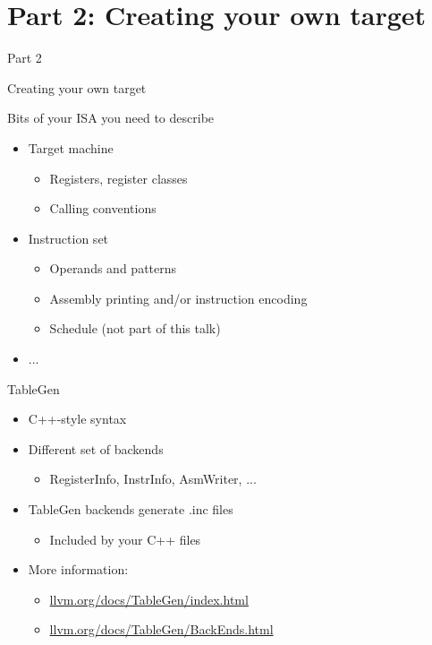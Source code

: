 \section{Part 2: Creating your own target}

\begin{frame}{Part 2}

Creating your own target

\end{frame}


\begin{frame}{Bits of your ISA you need to describe}

\begin{itemize}
    \item Target machine
    \begin{itemize}
        \item Registers, register classes
        \item Calling conventions
    \end{itemize}
    \item Instruction set
    \begin{itemize}
        \item Operands and patterns
        \item Assembly printing and/or instruction encoding
        \item Schedule (not part of this talk)
    \end{itemize}
    \item ...
\end{itemize}

\end{frame}


\begin{frame}{TableGen}

\begin{itemize}
    \item C++-style syntax
    \item Different set of backends
    \begin{itemize}
        \item RegisterInfo, InstrInfo, AsmWriter, ...
    \end{itemize}
    \item TableGen backends generate .inc files
    \begin{itemize}
        \item Included by your C++ files
    \end{itemize}
    \item More information:
    \begin{itemize}
        \item \url{llvm.org/docs/TableGen/index.html}
        \item \url{llvm.org/docs/TableGen/BackEnds.html}
    \end{itemize}
\end{itemize}

\end{frame}


